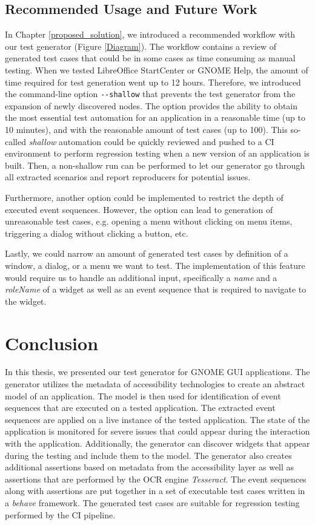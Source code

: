 \section{Recommended Usage and Future Work}\label{future_work}
In Chapter \ref{proposed_solution}, we introduced a recommended workflow with our test generator (Figure \ref{Diagram}). The workflow contains a review of generated test cases that could be in some cases as time consuming as manual testing. When we tested LibreOffice StartCenter or GNOME Help, the amount of time required for test generation went up to 12 hours. 
Therefore, we introduced the command-line option \texttt{-{}-shallow} that prevents the test generator from the expansion of newly discovered nodes. The option provides the ability to obtain the most essential test automation for an application in a reasonable time (up to 10 minutes), and with the reasonable amount of test cases (up to 100). This so-called \textit{shallow} automation could be quickly reviewed and pushed to a CI environment to perform regression testing when a new version of an application is built. Then, a non-shallow run can be performed to let our generator go through all extracted scenarios and report reproducers for potential issues.

Furthermore, another option could be implemented to restrict the depth of executed event sequences. However, the option can lead to generation of unreasonable test cases, e.g. opening a menu without clicking on menu items, triggering a dialog without clicking a button, etc.

Lastly, we could narrow an amount of generated test cases by definition of a window, a dialog, or a menu we want to test. The implementation of this feature would require us to handle an additional input, specifically a \textit{name} and a \textit{roleName} of a widget as well as an event sequence that is required to navigate to the widget.

\chapter{Conclusion}\label{conclusion}

In this thesis, we presented our test generator for GNOME GUI applications. The generator utilizes the metadata of accessibility technologies to create an abstract model of an application. The model is then used for identification of event sequences that are executed on a tested application. The extracted event sequences are applied on a live instance of the tested application. The state of the application is monitored for severe issues that could appear during the interaction with the application. Additionally, the generator can discover widgets that appear during the testing and include them to the model. The generator also creates additional assertions based on metadata from the accessibility layer as well as assertions that are performed by the OCR engine \textit{Tesseract}. The event sequences along with assertions are put together in a set of executable test cases written in a \textit{behave} framework. The generated test cases are suitable for regression testing performed by the CI pipeline.  

